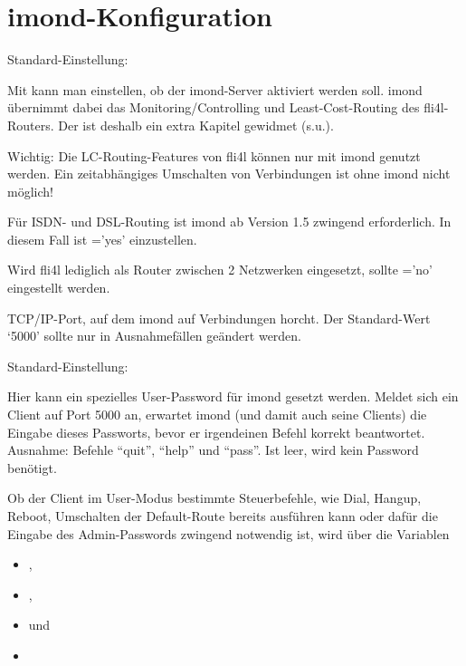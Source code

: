 \section{imond-Konfiguration}
\begin{description}


    Standard-Einstellung: 

    {Mit  kann man einstellen, ob der imond-Server
      aktiviert werden soll. imond übernimmt dabei das
      Monitoring/Controlling und Least-Cost-Routing des fli4l-Routers.
      Der  ist deshalb
      ein extra Kapitel gewidmet (s.u.).

      Wichtig: Die LC-Routing-Features von fli4l können nur mit imond
      genutzt werden. Ein zeitabhängiges Umschalten von Verbindungen
      ist ohne imond nicht möglich!

      Für ISDN- und DSL-Routing ist imond ab Version 1.5 zwingend
      erforderlich.  In diesem Fall ist ='yes'
      einzustellen.

      Wird fli4l lediglich als Router zwischen 2 Netzwerken
      eingesetzt, sollte ='no' eingestellt werden.}



    {TCP/IP-Port, auf dem imond auf Verbindungen horcht.  Der
      Standard-Wert `5000' sollte nur in Ausnahmefällen geändert
      werden.}


    
    Standard-Einstellung: 
    
    {Hier kann ein spezielles User-Password für imond gesetzt werden.
      Meldet sich ein Client auf Port 5000 an, erwartet imond (und
      damit auch seine Clients) die Eingabe dieses Passworts, bevor er
      irgendeinen Befehl korrekt beantwortet. Ausnahme: Befehle
      ``quit'', ``help'' und ``pass''.  Ist  leer, wird
      kein Password benötigt.

      Ob der Client im User-Modus bestimmte Steuerbefehle, wie Dial,
      Hangup, Reboot, Umschalten der Default-Route bereits ausführen
      kann oder dafür die Eingabe des Admin-Passwords zwingend
      notwendig ist, wird über die Variablen
      \begin{itemize}
      \item {},
      \item {},
      \item {} und
      \item {}
      \end{itemize}

}
\end{description}
